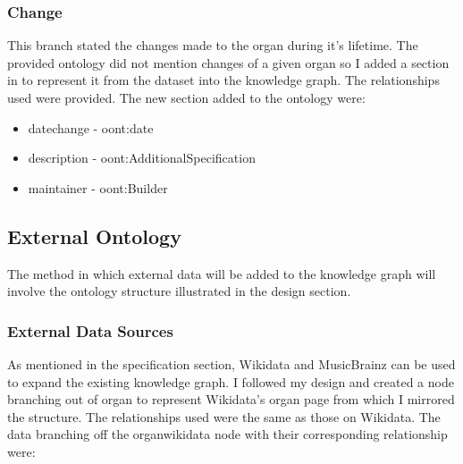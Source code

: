 \subsubsection{Change}
\hspace*{0.5cm} This branch stated the changes made to the organ during it's lifetime. The provided ontology did not mention changes of a given organ so I added a section in to represent it from the dataset into the knowledge graph. The relationships used were provided. The new section added to the ontology were:

\begin{itemize}
    \itemsep0em 
    \item datechange - oont:date 
    \item description - oont:AdditionalSpecification
    \item maintainer - oont:Builder
\end{itemize}

\subsection{External Ontology}
\hspace*{0.5cm} The method in which external data will be added to the knowledge graph will involve the ontology structure illustrated in the design section.

\subsubsection{External Data Sources}
\hspace*{0.5cm} As mentioned in the specification section, Wikidata and MusicBrainz can be used to expand the existing knowledge graph. I followed my design and created a node branching out of organ to represent Wikidata's organ page \cite{organwikidata} from which I mirrored the structure. The relationships used were the same as those on Wikidata. The data branching off the organwikidata node with their corresponding relationship were:

